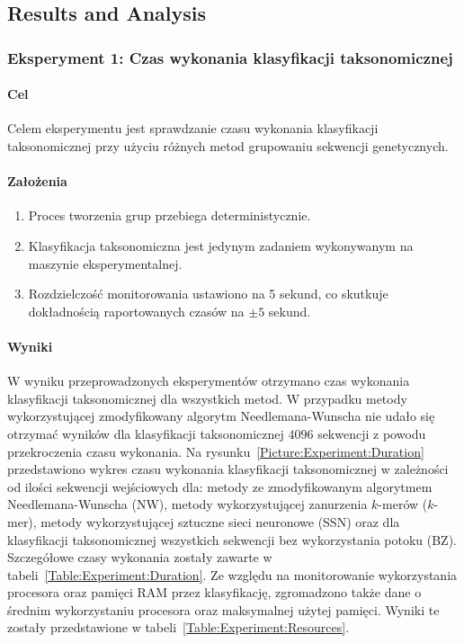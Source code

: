 \documentclass{article}
\newcommand{\temporary}[1]{
    \begin{tcolorbox}[colframe=red, colback=white, title={\textbf{WERSJA PO POLSKU}}, sharp corners=south]
        #1
    \end{tcolorbox}
}
\begin{document}
        \subsection{Results and Analysis}

            \temporary{
                \subsubsection{Eksperyment 1: Czas wykonania klasyfikacji taksonomicznej}

            \paragraph{Cel}
                Celem eksperymentu jest sprawdzanie czasu wykonania klasyfikacji taksonomicznej przy użyciu różnych metod grupowaniu sekwencji genetycznych.

            \paragraph{Założenia}
                \begin{enumerate}
                    \item {
                        Proces tworzenia grup przebiega deterministycznie.
                    }
                    \item {
                        Klasyfikacja taksonomiczna jest jedynym zadaniem wykonywanym na maszynie eksperymentalnej.
                    }
                    \item {
                        Rozdzielczość monitorowania ustawiono na 5 sekund, co skutkuje dokładnością raportowanych czasów na $\pm 5$ sekund.
                    }
                \end{enumerate}

            \paragraph{Wyniki}
                W wyniku przeprowadzonych eksperymentów otrzymano czas wykonania klasyfikacji taksonomicznej dla wszystkich metod. W przypadku metody wykorzystującej zmodyfikowany algorytm Needlemana-Wunscha nie udało się otrzymać wyników dla klasyfikacji taksonomicznej $4096$ sekwencji z powodu przekroczenia czasu wykonania. Na rysunku~\ref{Picture:Experiment:Duration} przedstawiono wykres czasu wykonania klasyfikacji taksonomicznej w zależności od ilości sekwencji wejściowych dla: metody ze zmodyfikowanym algorytmem Needlemana-Wunscha (NW), metody wykorzystującej zanurzenia $k$-merów ($k$-mer), metody wykorzystującej sztuczne sieci neuronowe (SSN) oraz dla klasyfikacji taksonomicznej wszystkich sekwencji bez wykorzystania potoku (BZ). Szczegółowe czasy wykonania zostały zawarte w tabeli~\ref{Table:Experiment:Duration}. Ze względu na monitorowanie wykorzystania procesora oraz pamięci RAM przez klasyfikację, zgromadzono także dane o średnim wykorzystaniu procesora oraz maksymalnej użytej pamięci. Wyniki te zostały przedstawione w tabeli~\ref{Table:Experiment:Resources}.

}
\end{document}
